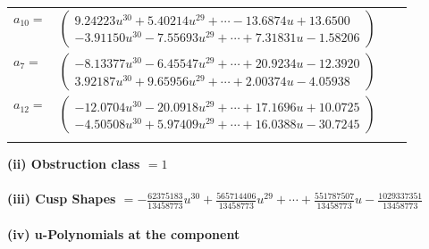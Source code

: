 \documentclass[1p]{elsarticle_modified}
\theoremstyle{definition}
\begin{document}
\begin{tabular}{m{7pt} m{180pt} m{7pt} m{180pt} }
\flushright $a_{10}=$&$\begin{pmatrix}9.24223 u^{30}+5.40214 u^{29}+\cdots-13.6874 u+13.6500\\-3.91150 u^{30}-7.55693 u^{29}+\cdots+7.31831 u-1.58206\end{pmatrix}$ \\
\flushright $a_{7}=$&$\begin{pmatrix}-8.13377 u^{30}-6.45547 u^{29}+\cdots+20.9234 u-12.3920\\3.92187 u^{30}+9.65956 u^{29}+\cdots+2.00374 u-4.05938\end{pmatrix}$ \\
\flushright $a_{12}=$&$\begin{pmatrix}-12.0704 u^{30}-20.0918 u^{29}+\cdots+17.1696 u+10.0725\\-4.50508 u^{30}+5.97409 u^{29}+\cdots+16.0388 u-30.7245\end{pmatrix}$\\&\end{tabular}
\flushleft \textbf{(ii) Obstruction class $= 1$}\\~\\
\flushleft \textbf{(iii) Cusp Shapes $= -\frac{62375183}{13458773} u^{30}+\frac{565714406}{13458773} u^{29}+\cdots+\frac{551787507}{13458773} u-\frac{1029337351}{13458773}$}\\~\\
\newpage\renewcommand{\arraystretch}{1}
\flushleft \textbf{(iv) u-Polynomials at the component}\newline \\
\end{document}
